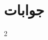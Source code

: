\documentclass[leqno,b5paper]{book}
\begin{document}
\chapter*{جوابات}
\immediate\closeout\tempfile
\begin{multicols}{2}
{\small

}
\end{multicols}

\appendix
%
%
%

%
%
%
\backmatter

\cleardoublepage
%
%


\renewcommand*{\indexname}{فرہنگ}      %
\cleardoublepage
{}
\end{document}
